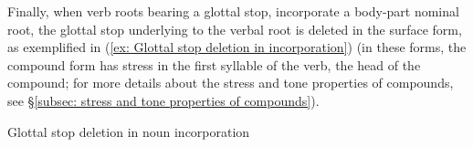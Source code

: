     \z
\z


Finally, when verb roots bearing a glottal stop, incorporate a body-part nominal root, the glottal stop underlying to the verbal root is deleted in the surface form, as exemplified in (\ref{ex: Glottal stop deletion in incorporation}) (in these forms, the compound form has stress in the first syllable of the verb, the head of the compound; for more details about the stress and tone properties of compounds, see §\ref{subsec: stress and tone properties of compounds}).

\ea\label{ex: Glottal stop deletion in incorporation}
{Glottal stop deletion in noun incorporation}

